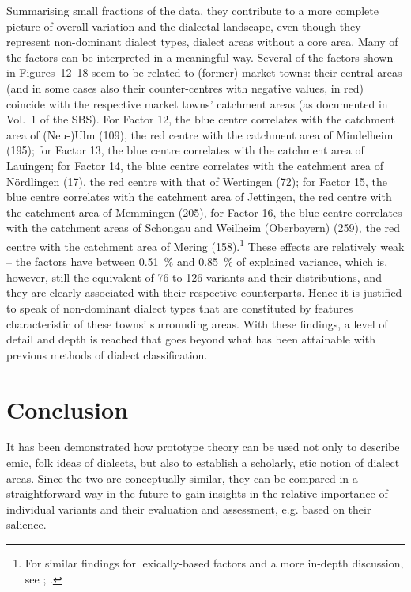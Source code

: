 \documentclass[output=paper]{LSP/langsci}
\begin{document}
Summarising small fractions of the data, they contribute to a more complete picture of overall variation and the dialectal landscape, even though they represent non-dominant dialect types, dialect areas without a core area. Many of the factors can be interpreted in a meaningful way. Several of the factors shown in Figures~12–18 seem to be related to (former) market towns: their central areas (and in some cases also their counter-centres with negative values, in red) coincide with the respective market towns’ catchment areas (as documented in Vol.~1 of the SBS). For Factor 12, the blue centre correlates with the catchment area of (Neu-)Ulm (109), the red centre with the catchment area of Mindelheim (195); for Factor 13, the blue centre correlates with the catchment area of Lauingen; for Factor 14, the blue centre correlates with the catchment area of Nördlingen (17), the red centre with that of Wertingen (72); for Factor 15, the blue centre correlates with the catchment area of Jettingen, the red centre with the catchment area of Memmingen (205), for Factor 16, the blue centre correlates with the catchment areas of Schongau and Weilheim (Oberbayern) (259), the red centre with the catchment area of Mering (158).\footnote{For similar findings for lexically-based factors and a more in-depth discussion, see \citet[170--196]{pickl_probabilistische_2013}; \citet{buhler_dialektraume_2014}.} These effects are relatively weak – the factors have between 0.51~\% and 0.85~\% of explained variance, which is, however, still the equivalent of 76 to 126 variants and their distributions, and they are clearly associated with their respective counterparts. Hence it is justified to speak of non-dominant dialect types that are constituted by features characteristic of these towns’ surrounding areas. With these findings, a level of detail and depth is reached that goes beyond what has been attainable with previous methods of dialect classification.

\section{Conclusion}
It has been demonstrated how prototype theory can be used not only to describe emic, folk ideas of dialects, but also to establish a scholarly, etic notion of dialect areas. Since the two are conceptually similar, they can be compared in a straightforward way in the future to gain insights in the relative importance of individual variants and their evaluation and assessment, e.g. based on their salience.
\end{document}
